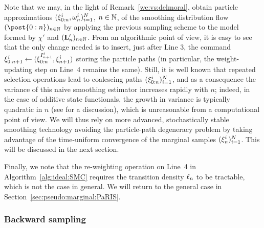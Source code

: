 Note that we may, in the light of Remark~\ref{we:vs:delmoral},  obtain particle approximations $(\xi_{0:n}^{i}, \omega_{n}^{i})_{i = 1}^N$, $n \in \mathbb{N}$, of the smoothing distribution flow $(\post{0:n})_{n \in \nset}$ by applying the previous sampling scheme to the model formed by $\chi'$ and $(\mathbf{L}_{n}')_{n \in \mathbb{N}}$. From an algorithmic point of view, it is easy to see that the only change needed is to insert, just after Line 3, the command $\xi_{0:n + 1}^{i} \gets (\xi_{0:n}^{I_{n + 1}^{i}}, \xi_{n + 1}^{i})$ storing the particle paths (in particular, the weight-updating step on Line~4 remains the same). Still, it is well known that repeated selection operations lead to coalescing paths $(\xi_{0:n}^{i})_{i = 1}^N$, and as a consequence the variance of this naive smoothing estimator increases rapidly with $n$; indeed, in the case of additive state functionals, the growth in variance is typically quadratic in $n$ (see \cite{olsson:westerborn:2014b} for a discussion), which is unreasonable from a computational point of view. We will thus rely on more advanced, stochastically stable smoothing technology avoiding the particle-path degeneracy problem by taking advantage of the time-uniform convergence of the marginal samples $(\xi_{n}^{i})_{i = 1}^N$. This will be discussed in the next section. 

Finally, we note that the re-weighting operation on Line~4 in Algorithm~\ref{alg:ideal:SMC} requires the transition density $\ell_{n}$ to be tractable, which is not the case in general. We will return to the general case in Section~\ref{sec:pseudo:marginal:PaRIS}. 


\subsubsection{Backward sampling} 
\label{sec:BS}

